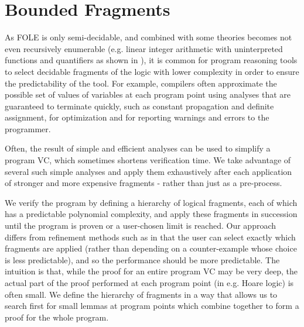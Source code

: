 \section{Bounded Fragments}
As FOLE is only semi-decidable, and combined with some theories becomes not even recursively enumerable (e.g. linear integer arithmetic with uninterpreted functions and quantifiers as shown in \cite{DBLP:conf/csl/KorovinV07}), 
it is common for program reasoning tools to select decidable fragments of the logic with lower complexity in order to ensure the predictability of the tool. For example, compilers often approximate the possible set of values of variables at each program point using analyses that are guaranteed to terminate quickly, such as constant propagation and definite assignment, for optimization and for reporting warnings and errors to the programmer.

Often, the result of simple and efficient analyses can be used to simplify a program VC, which sometimes shortens verification time.
We take advantage of several such simple analyses and apply them exhaustively after each application of stronger and more expensive fragments - rather than just as a pre-process. 

We verify the program by defining a hierarchy of logical fragments, each of which has a predictable polynomial complexity, and apply these fragments in succession until the program is proven or a user-chosen limit is reached. Our approach differs from refinement methods such as \cite{DBLP:journals/jacm/ClarkeGJLV03} in that the user can select exactly which fragments are applied (rather than depending on a counter-example whose choice is less predictable), 
and so the performance should be more predictable. The intuition is that, while the proof for an entire program VC may be very deep, the actual part of the proof performed at each program point (in e.g. Hoare logic) is often small.
We define the hierarchy of fragments in a way that allows us to search first for small lemmas at program points which combine together to form a proof for the whole program.

